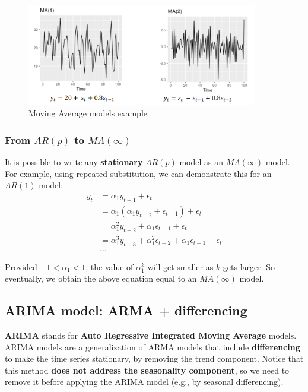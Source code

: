 \begin{figure}[H]
    \centering
    \includegraphics[width=0.9\textwidth]{figures/ma_model.png}
    \caption{Moving Average models example}
    \label{fig:ma_model}
\end{figure}

\subsubsection{From $AR(p)$ to $MA(\infty)$}

It is possible to write any \textbf{stationary} $AR(p)$ model as an $MA(\infty)$ model.
For example, using repeated substitution, we can demonstrate this for an $AR(1)$ model:
\begin{align*}
    y_t &= \alpha_1 y_{t-1} + \epsilon_t\\
    &= \alpha_1 (\alpha_1 y_{t-2} + \epsilon_{t-1}) + \epsilon_t\\
    &= \alpha_1^2 y_{t-2} + \alpha_1 \epsilon_{t-1} + \epsilon_t\\
    &= \alpha_1^3 y_{t-3} + \alpha_1^2 \epsilon_{t-2} + \alpha_1 \epsilon_{t-1} + \epsilon_t\\
    &...
\end{align*}

Provided $-1 < \alpha_1 < 1$, the value of $\alpha_1^k$ will get smaller as $k$ gets
larger. So eventually, we obtain the above equation equal to an $MA(\infty)$ model.

\subsection{ARIMA model: ARMA + differencing}

\textbf{ARIMA} stands for \textbf{Auto Regressive Integrated Moving Average} models.
ARIMA models are a generalization of ARMA models that include \textbf{differencing} to
make the time series stationary, by removing the trend component. Notice that this 
method \textbf{does not address the seasonality component}, so we need to remove it before
applying the ARIMA model (e.g., by seasonal differencing).\\

